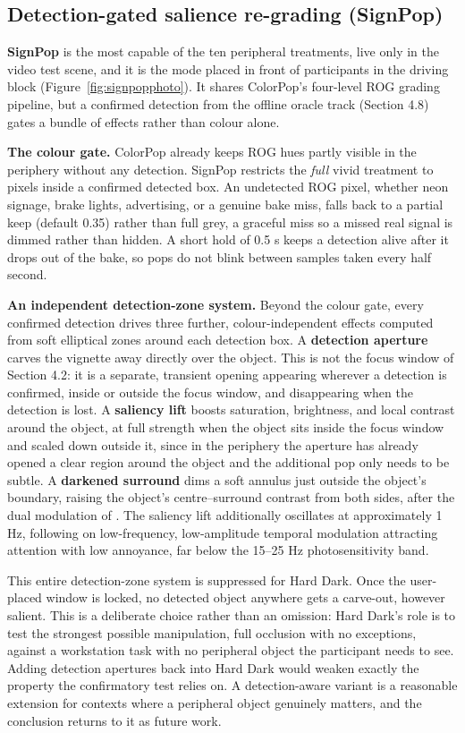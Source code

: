 \subsection{Detection-gated salience re-grading (SignPop)}

\textbf{SignPop} is the most capable of the ten peripheral treatments, live only in the video test
scene, and it is the mode placed in
front of participants in the driving block (Figure~\ref{fig:signpopphoto}). It shares ColorPop's
four-level ROG grading pipeline, but
a confirmed detection from the offline oracle track (Section 4.8) gates a bundle of effects rather
than colour alone.

\textbf{The colour gate.} ColorPop already keeps ROG hues partly visible in the periphery without any
detection. SignPop restricts the \textit{full} vivid treatment to pixels inside a confirmed detected
box. An undetected ROG pixel, whether neon signage, brake lights, advertising, or a genuine bake
miss, falls back to a partial keep (default 0.35) rather than full grey, a graceful miss so a missed
real signal is dimmed rather than hidden. A short hold of 0.5 s keeps a detection alive after it
drops out of the bake, so pops do not blink between samples taken every half second.

\textbf{An independent detection-zone system.} Beyond the colour gate, every confirmed detection
drives three further, colour-independent effects computed from soft elliptical zones around each
detection box. A \textbf{detection aperture} carves the vignette away directly over the object. This
is not the focus window of Section 4.2: it is a separate, transient opening appearing wherever a
detection is confirmed, inside or outside the focus window, and disappearing when the detection is
lost. A \textbf{saliency lift} boosts saturation, brightness, and local contrast around the object,
at full strength when the object sits inside the focus window and scaled down outside it, since in
the periphery the aperture has already opened a clear region around the object and the additional
pop only needs to be subtle. A
\textbf{darkened surround} dims a soft annulus just outside the object's boundary, raising the
object's centre–surround contrast from both sides, after the dual modulation of \citet{veas2011}. The
saliency lift additionally oscillates at approximately 1 Hz, following \citet{waldner2014} on
low-frequency, low-amplitude temporal modulation attracting attention with low annoyance, far below
the 15–25 Hz photosensitivity band.

This entire detection-zone system is suppressed for Hard Dark. Once the user-placed window is locked,
no detected object anywhere gets a carve-out, however salient. This is a deliberate choice rather
than an omission: Hard Dark's role is to test the strongest possible manipulation, full occlusion
with no exceptions, against a workstation task with no peripheral object the participant needs to
see. Adding detection apertures back into Hard Dark would weaken exactly the property the
confirmatory test relies on. A detection-aware variant is a reasonable extension for contexts where a
peripheral object genuinely matters, and the conclusion returns to it as future work.

